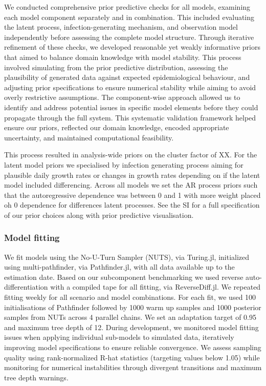 \documentclass{getwriting}
\begin{document}
We conducted comprehensive prior predictive checks for all models, examining each model component separately and in combination. This included evaluating the latent process, infection-generating mechanism, and observation model independently before assessing the complete model structure. Through iterative refinement of these checks, we developed reasonable yet weakly informative priors that aimed to balance domain knowledge with model stability. This process involved simulating from the prior predictive distribution, assessing the plausibility of generated data against expected epidemiological behaviour, and adjusting prior specifications to ensure numerical stability while aiming to avoid overly restrictive assumptions. The component-wise approach allowed us to identify and address potential issues in specific model elements before they could propagate through the full system. This systematic validation framework helped ensure our priors, reflected our domain knowledge, encoded appropriate uncertainty, and maintained computational feasibility. 

This process resulted in analysis-wide priors on the cluster factor of XX. For the latent model priors we specialised by infection generating process aiming for plausible daily growth rates or changes in growth rates depending on if the latent model included differencing. Across all models we set the AR process priors such that the autoregressive dependence was between 0 and 1 with more weight placed oh 0 dependence for differences latent processes. See the SI for a full specification of our prior choices along with prior predictive visualisation.

\subsubsection{Model fitting}

We fit models using the No-U-Turn Sampler (NUTS), via Turing.jl, initialized using multi-pathfinder, via Pathfinder.jl, with all data available up to the estimation date. Based on our subcomponent benchmarking we used reverse auto-differentiation with a compiled tape for all fitting, via ReverseDiff.jl. We repeated fitting weekly for all scenario and model combinations. For each fit, we used 100 initialisations of Pathfinder followed by 1000 warm up samples and 1000 posterior samples from NUTs across 4 parallel chains. We set an adaptation target of 0.95 and maximum tree depth of 12. During development, we monitored model fitting issues when applying individual sub-models to simulated data, iteratively improving model specifications to ensure reliable convergence. We assess sampling quality using rank-normalized R-hat statistics (targeting values below 1.05) while monitoring for numerical instabilities through divergent transitions and maximum tree depth warnings.
\end{document}
